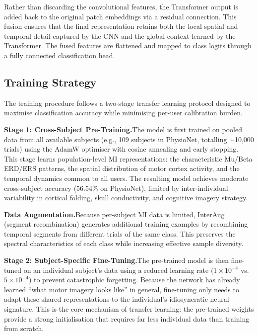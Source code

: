 \documentclass[12pt, a4paper]{article}
\begin{document}
Rather than discarding the convolutional features, the Transformer output is added back to the original patch embeddings via a residual connection. This fusion ensures that the final representation retains both the local spatial and temporal detail captured by the CNN and the global context learned by the Transformer. The fused features are flattened and mapped to class logits through a fully connected classification head.

\subsection{Training Strategy}

The training procedure follows a two-stage transfer learning protocol designed to maximise classification accuracy while minimising per-user calibration burden.

\textbf{Stage 1: Cross-Subject Pre-Training.}\quad The model is first trained on pooled data from all available subjects (e.g., 109 subjects in PhysioNet, totalling $\sim$10,000 trials) using the AdamW optimiser with cosine annealing and early stopping. This stage learns population-level MI representations: the characteristic Mu/Beta ERD/ERS patterns, the spatial distribution of motor cortex activity, and the temporal dynamics common to all users. The resulting model achieves moderate cross-subject accuracy (56.54\% on PhysioNet), limited by inter-individual variability in cortical folding, skull conductivity, and cognitive imagery strategy.

\textbf{Data Augmentation.}\quad Because per-subject MI data is limited, InterAug (segment recombination) generates additional training examples by recombining temporal segments from different trials of the same class. This preserves the spectral characteristics of each class while increasing effective sample diversity.

\textbf{Stage 2: Subject-Specific Fine-Tuning.}\quad The pre-trained model is then fine-tuned on an individual subject's data using a reduced learning rate ($1 \times 10^{-4}$ vs.\ $5 \times 10^{-4}$) to prevent catastrophic forgetting. Because the network has already learned ``what motor imagery looks like'' in general, fine-tuning only needs to adapt these shared representations to the individual's idiosyncratic neural signature. This is the core mechanism of transfer learning: the pre-trained weights provide a strong initialisation that requires far less individual data than training from scratch.
\end{document}
